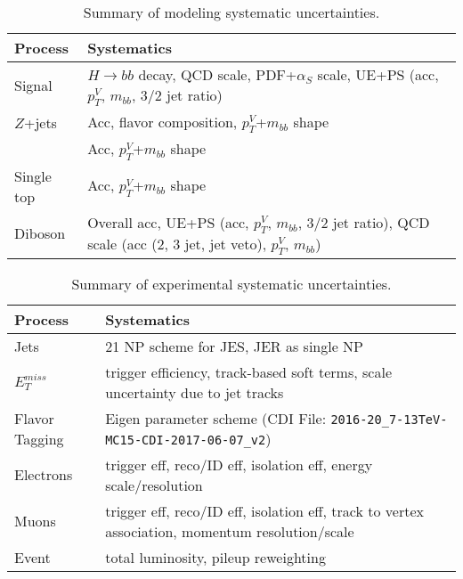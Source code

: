 \begin{table}[!htbp]\captionsetup{justification=centering}
  \begin{center}
    \begin{tabular}{lp{5in}}
      \hline\hline
      Process & Systematics\\
      \hline
      Signal  & $H\to bb$ decay, QCD scale, PDF+$\alpha_S$ scale, UE+PS (acc, $p_T^V$, $m_{bb}$, 3/2 jet ratio)\\
      $Z$+jets  & Acc, flavor composition, $p_T^V$+$m_{bb}$ shape\\
      \tt  & Acc, $p_T^V$+$m_{bb}$ shape\\
      Single top  & Acc, $p_T^V$+$m_{bb}$ shape\\
      Diboson  &  Overall acc, UE+PS (acc, $p_T^V$, $m_{bb}$, 3/2 jet ratio), QCD scale  (acc (2, 3 jet, jet veto), $p_T^V$, $m_{bb}$)\\
      \hline\hline
    \end{tabular}
  \end{center}
  \caption{Summary of modeling systematic uncertainties.}
  \label{tab:modelsys}
\end{table}

\begin{table}[!htbp]\captionsetup{justification=centering}
  \begin{center}
    \begin{tabular}{lp{5in}}
      \hline\hline
      Process & Systematics\\
      \hline
      Jets  & 21 NP scheme for JES, JER as single NP\\
      $E_T^{miss}$  & trigger efficiency, track-based soft terms, scale uncertainty due to jet tracks\\
      Flavor Tagging  & Eigen parameter scheme (CDI File: \texttt{2016-20\_7-13TeV-MC15-CDI-2017-06-07\_v2}) \\
      Electrons & trigger eff, reco/ID eff, isolation eff, energy scale/resolution\\
      Muons  & trigger eff, reco/ID eff, isolation eff, track to vertex association, momentum resolution/scale\\
      Event & total luminosity, pileup reweighting\\
      \hline\hline
    \end{tabular}
  \end{center}
  \caption{Summary of experimental systematic uncertainties.}
  \label{tab:expsys}
\end{table}

